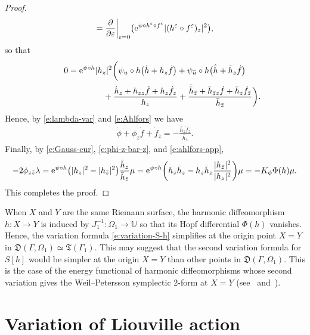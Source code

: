 \documentclass[pdftex]{sigma}%
\numberwithin{equation}{section}
\newcommand{\vep}{\varepsilon}
\begin{document}
\begin{proof}
\begin{gather*}
=\frac{\partial}{\partial\vep}\bigg|_{\vep=0} \big({\rm e}^{\psi\circ h^\vep \circ f^\vep} |(h^\vep \circ f^\vep)_z|^2 \big),
\end{gather*}
so that
\begin{gather}
0= {\rm e}^{\psi\circ h} |h_z|^2\bigg(\psi_u\circ h \big(\dot{h}+h_z \dot{f} \big) +\psi_{\bar{u}} \circ h \big( \dot{\bar{h}}+ \bar{h}_z \dot{f} \big)\nonumber
\\ \hphantom{0= {\rm e}^{\psi\circ h} |h_z|^2\bigg(}
{} + \frac{\dot{h}_z+h_{zz}\dot{f} +h_z \dot{f}_z}{ h_z}+ \frac{\dot{\bar{h}}_{\bar{z}}+\bar{h}_{\bar{z}z}\dot{f}+\bar{h}_{z}\dot{f}_{\bar{z}} }{ \bar{h}_{\bar{z}}} \bigg).\label{e:Ahlfors}
\end{gather}
Hence, by \eqref{e:lambda-var} and \eqref{e:Ahlfors} we have
\begin{gather}\label{e:ahlfors-app}
\dot{\phi}+\phi_z\dot{f}+\dot{f}_z = -\frac{\bar{h}_{z}\dot{f}_{\bar{z}} }{ \bar{h}_{\bar{z}}}.
\end{gather}
Finally, by \eqref{e:Gauss-cur}, \eqref{e:phi-z-bar-z}, and \eqref{e:ahlfors-app},
\begin{gather*}
- 2\phi_{z\bar{z}} \lambda= {\rm e}^{\psi\circ h} \big(|h_{{z}}|^2- |h_{\bar{z}}|^2\big) \frac{\bar{h}_{z} }{ \bar{h}_{\bar{z}}} \mu
= {\rm e}^{\psi\circ h} \bigg( h_{{z}} \bar{h}_{z}- h_{{z}} \bar{h}_{z} \frac{|h_{\bar{z}}|^2}{{|h_{z}|^2}} \bigg) \mu = -K_{\phi} \Phi(h) \mu.
\end{gather*}
This completes the proof.
\end{proof}

\begin{Remark}%
When $X$ and $Y$ are the same Riemann surface, the harmonic diffeomorphism $h\colon X\to Y$ is induced by $J_1^{-1}\colon \Omega_1\to \mathbb{U}$ so that its Hopf differential $\Phi(h)$ vanishes. Hence, the variation formula \eqref{e:variation-S-h} simplifies at the origin point $X=Y$ in $\mathfrak{D}(\Gamma,\Omega_1) \simeq \mathfrak{T}(\Gamma_1)$.
This may suggest that the second variation formula for $S[h]$ would be simpler at the origin $X=Y$ than other points in $\mathfrak{D}(\Gamma,\Omega_1)$. This is the case of
the energy functional of harmonic diffeomorphisms whose second variation gives the Weil--Petersson symplectic 2-form at $X=Y$ (see~\cite[Corollary~5.8]{W89} and~\cite[Theorem~3.1.3]{Tromba}).
\end{Remark}

\section{Variation of Liouville action}\label{s:variation}
\end{document}
